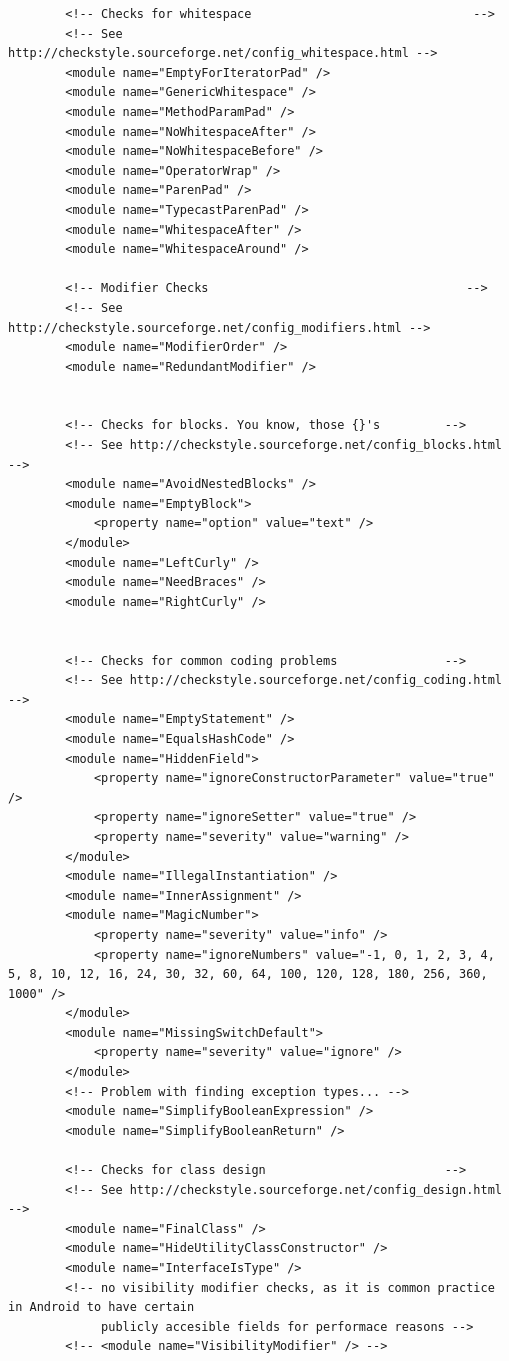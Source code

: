 \begin{lstlisting}
        <!-- Checks for whitespace                               -->
        <!-- See http://checkstyle.sourceforge.net/config_whitespace.html -->
        <module name="EmptyForIteratorPad" />
        <module name="GenericWhitespace" />
        <module name="MethodParamPad" />
        <module name="NoWhitespaceAfter" />
        <module name="NoWhitespaceBefore" />
        <module name="OperatorWrap" />
        <module name="ParenPad" />
        <module name="TypecastParenPad" />
        <module name="WhitespaceAfter" />
        <module name="WhitespaceAround" />

        <!-- Modifier Checks                                    -->
        <!-- See http://checkstyle.sourceforge.net/config_modifiers.html -->
        <module name="ModifierOrder" />
        <module name="RedundantModifier" />


        <!-- Checks for blocks. You know, those {}'s         -->
        <!-- See http://checkstyle.sourceforge.net/config_blocks.html -->
        <module name="AvoidNestedBlocks" />
        <module name="EmptyBlock">
            <property name="option" value="text" />
        </module>
        <module name="LeftCurly" />
        <module name="NeedBraces" />
        <module name="RightCurly" />


        <!-- Checks for common coding problems               -->
        <!-- See http://checkstyle.sourceforge.net/config_coding.html -->
        <module name="EmptyStatement" />
        <module name="EqualsHashCode" />
        <module name="HiddenField">
            <property name="ignoreConstructorParameter" value="true" />
            <property name="ignoreSetter" value="true" />
            <property name="severity" value="warning" />
        </module>
        <module name="IllegalInstantiation" />
        <module name="InnerAssignment" />
        <module name="MagicNumber">
            <property name="severity" value="info" />
            <property name="ignoreNumbers" value="-1, 0, 1, 2, 3, 4, 5, 8, 10, 12, 16, 24, 30, 32, 60, 64, 100, 120, 128, 180, 256, 360, 1000" />
        </module>
        <module name="MissingSwitchDefault">
            <property name="severity" value="ignore" />
        </module>
        <!-- Problem with finding exception types... -->
        <module name="SimplifyBooleanExpression" />
        <module name="SimplifyBooleanReturn" />

        <!-- Checks for class design                         -->
        <!-- See http://checkstyle.sourceforge.net/config_design.html -->
        <module name="FinalClass" />
        <module name="HideUtilityClassConstructor" />
        <module name="InterfaceIsType" />
        <!-- no visibility modifier checks, as it is common practice in Android to have certain
             publicly accesible fields for performace reasons -->
        <!-- <module name="VisibilityModifier" /> -->



\end{lstlisting}
